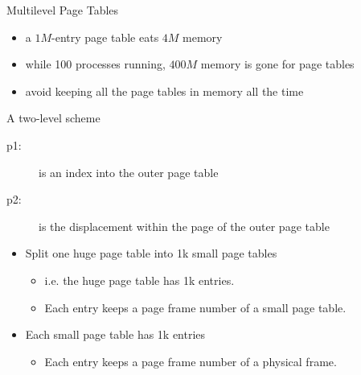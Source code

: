 \begin{frame}{Multilevel Page Tables}
    \begin{itemize}
    \item a $1M$-entry page table eats $4M$ memory
    \item while 100 processes running, $400M$ memory is gone for page tables
    \item avoid keeping all the page tables in memory all the time
    \end{itemize}
    \begin{block}{A two-level scheme}
      \begin{center}
      \end{center}
    \end{block}    
\end{frame}

\begin{description}
\item[p1:] is an index into the outer page table
\item[p2:] is the displacement within the page of the outer page table
\end{description}

\begin{itemize}
\item Split one huge page table into 1k small page tables
  \begin{itemize}
  \item i.e. the huge page table has 1k entries.
  \item Each entry keeps a page frame number of a small page table.
  \end{itemize}
\item Each small page table has 1k entries
  \begin{itemize}
  \item Each entry keeps a page frame number of a physical frame.
  \end{itemize}
\end{itemize}

